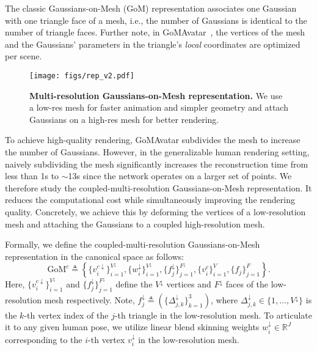 The classic Gaussians-on-Mesh (GoM) representation associates one Gaussian with one triangle face of a mesh, i.e., the number of Gaussians is identical to the number of triangle faces. Further note, in GoMAvatar~\citep{wen2024gomavatar}, the vertices of the mesh and the Gaussians' parameters in the triangle's \textit{local} coordinates are optimized per scene. 
\begin{wrapfigure}{r}{0.5\textwidth}
        \texttt{[image: figs/rep\_v2.pdf]}
    \vspace{-5mm}
    \caption{\textbf{Multi-resolution Gaussians-on-Mesh representation.} We use a low-res mesh for faster animation and simpler geometry and attach Gaussians on a high-res mesh for better rendering.}
    \label{fig: gom_representation}
    \vspace{-8mm}
\end{wrapfigure}
To achieve high-quality rendering, GoMAvatar subdivides the mesh to increase the number of Gaussians. However, in the generalizable human rendering setting,  naively subdividing the mesh significantly increases the reconstruction time from less than 1s to $\sim$13s since the network operates on a larger set of points. We therefore study the coupled-multi-resolution Gaussians-on-Mesh representation. It reduces the computational cost while simultaneously improving the rendering quality. Concretely, we achieve this by  deforming the vertices of a low-resolution mesh and attaching the Gaussians to a coupled high-resolution mesh.

Formally, we define the coupled-multi-resolution Gaussians-on-Mesh representation in the canonical space as follows:
\begin{equation}
    \text{GoM}^c \triangleq \left\{\{v_{i}^{c\downarrow}\}_{i=1}^{V^\downarrow}, \{w_{i}^\downarrow\}_{i=1}^{V^\downarrow}, \{f_{j}^\downarrow\}_{j=1}^{F^\downarrow}, \{v_{i}^c\}_{i=1}^V, \{f_{j}\}_{j=1}^{F}\right\}. \label{eq: gom_c}
\end{equation}
Here, $\{v_{i}^{c\downarrow}\}_{i=1}^{V^\downarrow}$ and $\{f_{j}^\downarrow\}_{j=1}^{F^\downarrow}$ define the $V^\downarrow$ vertices and $F^\downarrow$ faces of the low-resolution mesh respectively. Note, $f_j^\downarrow \triangleq (\{\Delta_{j,k}^\downarrow\}_{k=1}^3)$, where $\Delta_{j,k}^\downarrow \in \{1, \dots, V^\downarrow\}$ is the $k$-th vertex index of the $j$-th triangle in the low-resolution mesh. To articulate it to any given human pose, we utilize  linear blend skinning weights $w_{i}^\downarrow \in \mathbb{R}^J$ corresponding to the $i$-th vertex $v_{i}^\downarrow$ in the low-resolution mesh. 

